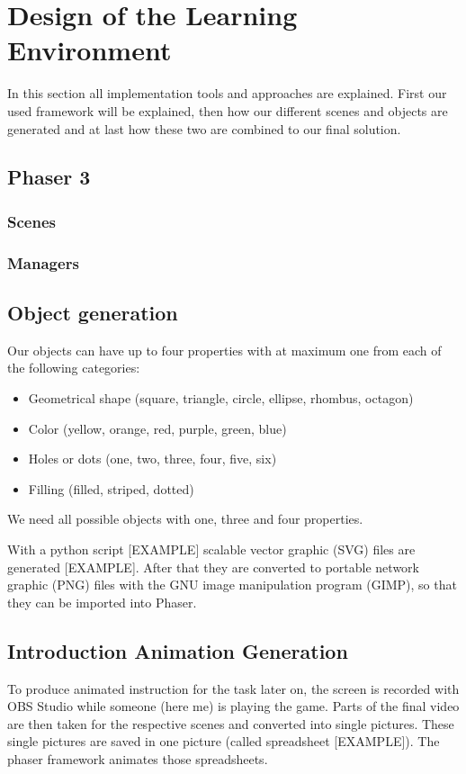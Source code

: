 
\chapter{Design of the Learning Environment}
\label{chap:design}

In this section all implementation tools and approaches are explained.
First our used framework will be explained, then how our different scenes and objects are generated and
at last how these two are combined to our final solution.

\section{Phaser 3}

\subsection{Scenes}
\subsection{Managers}
\section{Object generation}
Our objects can have up to four properties with at maximum one from each of the following categories:
\begin{itemize}
    \item Geometrical shape (square, triangle, circle, ellipse, rhombus, octagon)
    \item Color (yellow, orange, red, purple, green, blue)
    \item Holes or dots (one, two, three, four, five, six)
    \item Filling (filled, striped, dotted)
\end{itemize}

We need all possible objects with one, three and four properties.

With a python script [EXAMPLE] scalable vector graphic (SVG) files are generated [EXAMPLE].
After that they are converted to portable network graphic (PNG) files with the GNU image manipulation program (GIMP),
so that they can be imported into Phaser.

\section{Introduction Animation Generation}
To produce animated instruction for the task later on,
the screen is recorded with OBS Studio while someone (here me) is playing the game.
Parts of the final video are then taken for the respective scenes and converted into single pictures.
These single pictures are saved in one picture (called spreadsheet [EXAMPLE]).
The phaser framework animates those spreadsheets.

